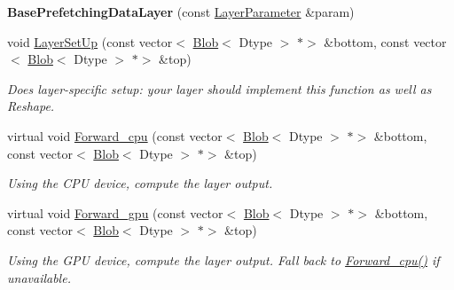 \begin{DoxyCompactItemize}
\mbox{\label{classcaffe_1_1_base_prefetching_data_layer_a527e2b51c73759ea5f7e28ced6a371ef}} 
{\bfseries Base\+Prefetching\+Data\+Layer} (const \mbox{\hyperlink{classcaffe_1_1_layer_parameter}{Layer\+Parameter}} \&param)
\item 
void \mbox{\hyperlink{classcaffe_1_1_base_prefetching_data_layer_ad3b7914abaa6d46c148864c0e28204ad}{Layer\+Set\+Up}} (const vector$<$ \mbox{\hyperlink{classcaffe_1_1_blob}{Blob}}$<$ Dtype $>$ $\ast$$>$ \&bottom, const vector$<$ \mbox{\hyperlink{classcaffe_1_1_blob}{Blob}}$<$ Dtype $>$ $\ast$$>$ \&top)
\begin{DoxyCompactList}\small\item\em Does layer-\/specific setup\+: your layer should implement this function as well as Reshape. \end{DoxyCompactList}\item 
\mbox{\label{classcaffe_1_1_base_prefetching_data_layer_a047f411e9c940ea068e4d70f53043bb1}} 
virtual void \mbox{\hyperlink{classcaffe_1_1_base_prefetching_data_layer_a047f411e9c940ea068e4d70f53043bb1}{Forward\+\_\+cpu}} (const vector$<$ \mbox{\hyperlink{classcaffe_1_1_blob}{Blob}}$<$ Dtype $>$ $\ast$$>$ \&bottom, const vector$<$ \mbox{\hyperlink{classcaffe_1_1_blob}{Blob}}$<$ Dtype $>$ $\ast$$>$ \&top)
\begin{DoxyCompactList}\small\item\em Using the C\+PU device, compute the layer output. \end{DoxyCompactList}\item 
\mbox{\label{classcaffe_1_1_base_prefetching_data_layer_a3cc79458a096ec130139b92f4f379aa2}} 
virtual void \mbox{\hyperlink{classcaffe_1_1_base_prefetching_data_layer_a3cc79458a096ec130139b92f4f379aa2}{Forward\+\_\+gpu}} (const vector$<$ \mbox{\hyperlink{classcaffe_1_1_blob}{Blob}}$<$ Dtype $>$ $\ast$$>$ \&bottom, const vector$<$ \mbox{\hyperlink{classcaffe_1_1_blob}{Blob}}$<$ Dtype $>$ $\ast$$>$ \&top)
\begin{DoxyCompactList}\small\item\em Using the G\+PU device, compute the layer output. Fall back to \mbox{\hyperlink{classcaffe_1_1_base_prefetching_data_layer_a21fea2e38602ff125fceafe2feece212}{Forward\+\_\+cpu()}} if unavailable. \end{DoxyCompactList}\end{DoxyCompactItemize}
